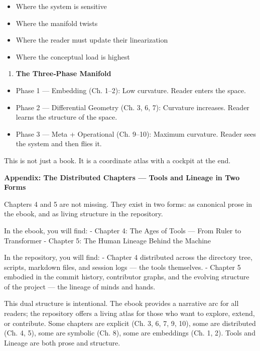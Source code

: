\begin{itemize}
\tightlist
\item
  Where the system is sensitive
\item
  Where the manifold twists
\item
  Where the reader must update their linearization
\item
  Where the conceptual load is highest
\end{itemize}

\begin{enumerate}
\def\labelenumi{\arabic{enumi}.}
\setcounter{enumi}{5}
\tightlist
\item
  \textbf{The Three‑Phase Manifold}
\end{enumerate}

\begin{itemize}
\tightlist
\item
  Phase 1 --- Embedding (Ch. 1--2): Low curvature. Reader enters the
  space.
\item
  Phase 2 --- Differential Geometry (Ch. 3, 6, 7): Curvature increases.
  Reader learns the structure of the space.
\item
  Phase 3 --- Meta + Operational (Ch. 9--10): Maximum curvature. Reader
  sees the system and then flies it.
\end{itemize}

This is not just a book. It is a coordinate atlas with a cockpit at the
end.

\newpage
\vspace*{2cm}

\noindent\textbf{\large Appendix: The Distributed Chapters — Tools and Lineage in Two Forms}

Chapters 4 and 5 are not missing. They exist in two forms: as canonical
prose in the ebook, and as living structure in the repository.

In the ebook, you will find: - Chapter 4: The Ages of Tools --- From
Ruler to Transformer - Chapter 5: The Human Lineage Behind the Machine

In the repository, you will find: - Chapter 4 distributed across the
directory tree, scripts, markdown files, and session logs --- the tools
themselves. - Chapter 5 embodied in the commit history, contributor
graphs, and the evolving structure of the project --- the lineage of
minds and hands.

This dual structure is intentional. The ebook provides a narrative arc
for all readers; the repository offers a living atlas for those who want
to explore, extend, or contribute. Some chapters are explicit (Ch. 3, 6,
7, 9, 10), some are distributed (Ch. 4, 5), some are symbolic (Ch. 8),
some are embeddings (Ch. 1, 2). Tools and Lineage are both prose and
structure.

